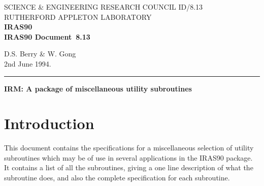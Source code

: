 \pagestyle{myheadings}

\newcommand{\irasdoccategory}  {IRAS90 Document}
\newcommand{\irasdocinitials}  {ID}
\newcommand{\irasdocnumber}    {8.13}
\newcommand{\irasdocauthors}   {D.S. Berry \& W. Gong}
\newcommand{\irasdocdate}      {2nd June 1994.}
\newcommand{\irasdoctitle}     {IRM: A package of miscellaneous utility subroutines}

\newcommand{\irasdocname}{\irasdocinitials /\irasdocnumber}
\renewcommand{\_}{{\tt\char'137}}     %
\markright{\irasdocname}
\setlength{\textwidth}{160mm}
\setlength{\textheight}{240mm}
\setlength{\topmargin}{-5mm}
\setlength{\oddsidemargin}{0mm}
\setlength{\evensidemargin}{0mm}
\setlength{\parindent}{0mm}
\setlength{\parskip}{\medskipamount}
\setlength{\unitlength}{1mm}



\thispagestyle{empty}
SCIENCE \& ENGINEERING RESEARCH COUNCIL \hfill \irasdocname\\
RUTHERFORD APPLETON LABORATORY\\
{\large\bf IRAS90\\}
{\large\bf \irasdoccategory\ \irasdocnumber}
\begin{flushright}
\irasdocauthors\\
\irasdocdate
\end{flushright}
\vspace{-4mm}
\rule{\textwidth}{0.5mm}
\vspace{5mm}
\begin{center}
{\Large\bf \irasdoctitle}
\end{center}
\vspace{5mm}

\setlength{\parskip}{0mm}
\tableofcontents
\setlength{\parskip}{\medskipamount}
\markright{\irasdocname}

\section {Introduction}
This document contains the specifications for a miscellaneous selection of
utility subroutines which may be of use in several applications in the IRAS90
package. It contains a list of all the subroutines, giving a one line
description of what the subroutine does, and also the complete specification
for each subroutine.


